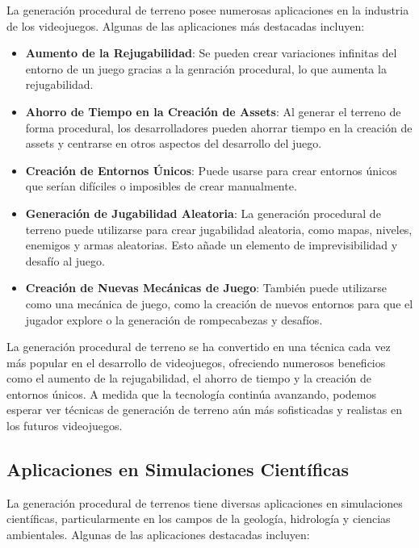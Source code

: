 La generación procedural de terreno posee numerosas aplicaciones en la industria de los videojuegos. Algunas de las aplicaciones más destacadas incluyen:

\begin{itemize}
    \item \textbf{Aumento de la Rejugabilidad}: Se pueden crear variaciones infinitas del entorno de un juego gracias a la genración procedural, lo que aumenta la rejugabilidad\cite{Rejugabilidad}.

    \item \textbf{Ahorro de Tiempo en la Creación de Assets}: Al generar el terreno de forma procedural, los desarrolladores pueden ahorrar tiempo en la creación de assets y centrarse en otros aspectos del desarrollo del juego\cite{AhorroTiempo}.

    \item \textbf{Creación de Entornos Únicos}: Puede usarse para crear entornos únicos que serían difíciles o imposibles de crear manualmente\cite{EntornosUnicos}.

    \item \textbf{Generación de Jugabilidad Aleatoria}: La generación procedural de terreno puede utilizarse para crear jugabilidad aleatoria, como mapas, niveles, enemigos y armas aleatorias. Esto añade un elemento de imprevisibilidad y desafío al juego\cite{JugabilidadAleatoria}.

    \item \textbf{Creación de Nuevas Mecánicas de Juego}: También puede utilizarse como una mecánica de juego, como la creación de nuevos entornos para que el jugador explore o la generación de rompecabezas y desafíos\cite{NuevasMecanicas}.
\end{itemize} 

La generación procedural de terreno se ha convertido en una técnica cada vez más popular en el desarrollo de videojuegos, ofreciendo numerosos beneficios como el aumento de la rejugabilidad, el ahorro de tiempo y la creación de entornos únicos. A medida que la tecnología continúa avanzando, podemos esperar ver técnicas de generación de terreno aún más sofisticadas y realistas en los futuros videojuegos.

\subsection{Aplicaciones en Simulaciones Científicas}

La generación procedural de terrenos tiene diversas aplicaciones en simulaciones científicas, particularmente en los campos de la geología, hidrología y ciencias ambientales. Algunas de las aplicaciones destacadas incluyen:

